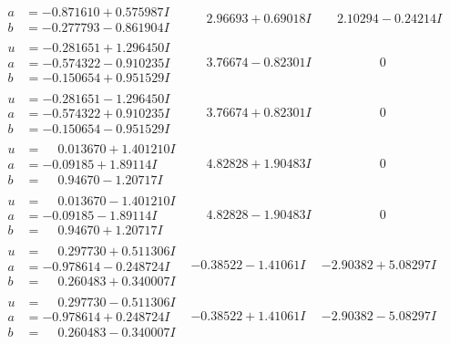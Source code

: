\documentclass[1p]{elsarticle_modified}
\theoremstyle{definition}
\begin{document}
$$\begin{array}{c|c|c}
\begin{aligned}
a &= -0.871610 + 0.575987 I \\
b &= -0.277793 - 0.861904 I\end{aligned}
 & \phantom{-}2.96693 + 0.69018 I & \phantom{-}2.10294 - 0.24214 I \\ \hline\begin{aligned}
u &= -0.281651 + 1.296450 I \\
a &= -0.574322 - 0.910235 I \\
b &= -0.150654 + 0.951529 I\end{aligned}
 & \phantom{-}3.76674 - 0.82301 I & \phantom{-0.000000 } 0 \\ \hline\begin{aligned}
u &= -0.281651 - 1.296450 I \\
a &= -0.574322 + 0.910235 I \\
b &= -0.150654 - 0.951529 I\end{aligned}
 & \phantom{-}3.76674 + 0.82301 I & \phantom{-0.000000 } 0 \\ \hline\begin{aligned}
u &= \phantom{-}0.013670 + 1.401210 I \\
a &= -0.09185 + 1.89114 I \\
b &= \phantom{-}0.94670 - 1.20717 I\end{aligned}
 & \phantom{-}4.82828 + 1.90483 I & \phantom{-0.000000 } 0 \\ \hline\begin{aligned}
u &= \phantom{-}0.013670 - 1.401210 I \\
a &= -0.09185 - 1.89114 I \\
b &= \phantom{-}0.94670 + 1.20717 I\end{aligned}
 & \phantom{-}4.82828 - 1.90483 I & \phantom{-0.000000 } 0 \\ \hline\begin{aligned}
u &= \phantom{-}0.297730 + 0.511306 I \\
a &= -0.978614 - 0.248724 I \\
b &= \phantom{-}0.260483 + 0.340007 I\end{aligned}
 & -0.38522 - 1.41061 I & -2.90382 + 5.08297 I \\ \hline\begin{aligned}
u &= \phantom{-}0.297730 - 0.511306 I \\
a &= -0.978614 + 0.248724 I \\
b &= \phantom{-}0.260483 - 0.340007 I\end{aligned}
 & -0.38522 + 1.41061 I & -2.90382 - 5.08297 I \\ \hline\begin{aligned}

\end{aligned}
\end{array}$$
\end{document}
